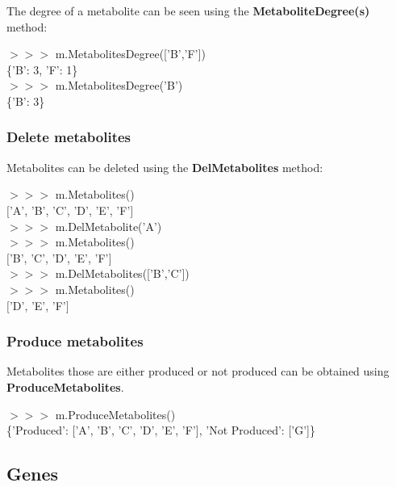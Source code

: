 The degree of a metabolite can be seen using the \textbf{MetaboliteDegree(s)} method:
\begin{framed}
$>>>$ m.MetabolitesDegree(['B','F'])\\
\{'B': 3, 'F': 1\}\\

$>>>$ m.MetabolitesDegree('B')\\
\{'B': 3\}
\end{framed}


\subsubsection{Delete metabolites}

Metabolites can be deleted using the \textbf{DelMetabolites} method:

\begin{framed}
$>>>$ m.Metabolites()\\
$[$'A', 'B', 'C', 'D', 'E', 'F'$]$\\

$>>>$ m.DelMetabolite('A')\\
$>>>$ m.Metabolites()\\
$[$'B', 'C', 'D', 'E', 'F'$]$\\

$>>>$ m.DelMetabolites(['B','C'])\\
$>>>$ m.Metabolites()\\
$[$'D', 'E', 'F'$]$
\end{framed}


\subsubsection{Produce metabolites}

Metabolites those are either produced or not produced can be obtained using \textbf{ProduceMetabolites}.

\begin{framed}
$>>>$ m.ProduceMetabolites()\\
\{'Produced': ['A', 'B', 'C', 'D', 'E', 'F'], 'Not Produced': ['G']\}
\end{framed}


\subsection{Genes}

